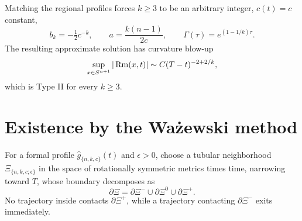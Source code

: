 \begin{proposition}
\label{prop:chow-iv-matched-parameters}


Matching the regional profiles forces $k\ge3$ to be an arbitrary integer,
$c(t)=c$ constant,
\[
 b_k=-\tfrac12c^{-k},\qquad a=\frac{k(n-1)}{2c},
 \qquad \Gamma(\tau)=e^{(1-1/k)\tau}.
\]
The resulting approximate solution has curvature blow-up
\[
 \sup_{x\in S^{n+1}}|\operatorname{Rm}(x,t)|\sim C(T-t)^{-2+2/k},
\]
which is Type II for every $k\ge3$.
\end{proposition}

\section{Existence by the Ważewski method}

\begin{definition}
\label{def:chow-iv-wazewski-tubular-neighborhood}


For a formal profile $\widehat g_{\{n,k,c\}}(t)$ and $\epsilon>0$, choose a
tubular neighborhood $\Xi_{\{n,k,c;\epsilon\}}$ in the space of rotationally
symmetric metrics times time, narrowing toward $T$, whose boundary decomposes
as
\[
 \partial\Xi=\partial\Xi^-\cup\partial\Xi^0\cup\partial\Xi^+.
\]
No trajectory inside contacts $\partial\Xi^+$, while a trajectory contacting
$\partial\Xi^-$ exits immediately.
\end{definition}

